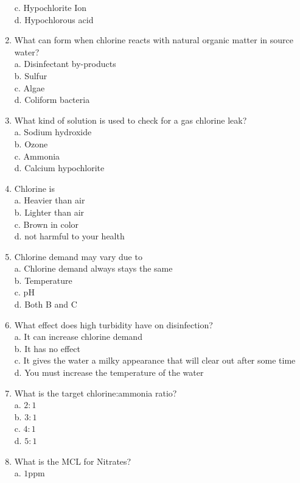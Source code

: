 \begin{enumerate}[1.]
c. Hypochlorite Ion\\
d. Hypochlorous acid\\
\item What can form when chlorine reacts with natural organic matter in source water?\\
a. Disinfectant by-products\\
b. Sulfur\\
c. Algae\\
d. Coliform bacteria\\
\item What kind of solution is used to check for a gas chlorine leak?\\
a. Sodium hydroxide\\
b. Ozone\\
c. Ammonia\\
d. Calcium hypochlorite\\
\item Chlorine is\\
a. Heavier than air\\
b. Lighter than air\\
c. Brown in color\\
d. not harmful to your health\\
\item Chlorine demand may vary due to\\
a. Chlorine demand always stays the same\\
b. Temperature\\
c. $\mathrm{pH}$\\
d. Both B and C\\
\item What effect does high turbidity have on disinfection?\\
a. It can increase chlorine demand\\
b. It has no effect\\
c. It gives the water a milky appearance that will clear out after some time\\
d. You must increase the temperature of the water\\
\item What is the target chlorine:ammonia ratio?\\
a. $2: 1$\\
b. $3: 1$\\
c. $4: 1$\\
d. $5: 1$\\
\item What is the MCL for Nitrates?\\
a. $1 \mathrm{ppm}$\\

\end{enumerate}
